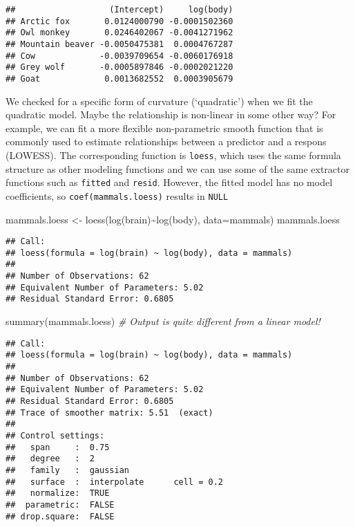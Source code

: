 \documentclass[
]{article}
\newenvironment{Shaded}{\begin{snugshade}}{\end{snugshade}}
\newcommand{\AttributeTok}[1]{\textcolor[rgb]{0.77,0.63,0.00}{#1}}
\newcommand{\CommentTok}[1]{\textcolor[rgb]{0.56,0.35,0.01}{\textit{#1}}}
\newcommand{\FunctionTok}[1]{\textcolor[rgb]{0.00,0.00,0.00}{#1}}
\newcommand{\NormalTok}[1]{#1}
\newcommand{\OtherTok}[1]{\textcolor[rgb]{0.56,0.35,0.01}{#1}}
\newcommand{\SpecialCharTok}[1]{\textcolor[rgb]{0.00,0.00,0.00}{#1}}
\begin{document}
\begin{verbatim}
##                   (Intercept)     log(body)
## Arctic fox       0.0124000790 -0.0001502360
## Owl monkey       0.0246402067 -0.0041271962
## Mountain beaver -0.0050475381  0.0004767287
## Cow             -0.0039709654 -0.0060176918
## Grey wolf       -0.0005897846 -0.0002021220
## Goat             0.0013682552  0.0003905679
\end{verbatim}

We checked for a specific form of curvature (`quadratic') when we fit
the quadratic model. Maybe the relationship is non-linear in some other
way? For example, we can fit a more flexible non-parametric smooth
function that is commonly used to estimate relationships between a
predictor and a respons (LOWESS). The corresponding function is
\texttt{loess}, which uses the same formula structure as other modeling
functions and we can use some of the same extractor functions such as
\texttt{fitted} and \texttt{resid}. However, the fitted model has no
model coefficients, so \texttt{coef(mammals.loess)} results in
\texttt{NULL}

\begin{Shaded}
\begin{Highlighting}[]
\NormalTok{mammals.loess }\OtherTok{\textless{}{-}} \FunctionTok{loess}\NormalTok{(}\FunctionTok{log}\NormalTok{(brain)}\SpecialCharTok{\textasciitilde{}}\FunctionTok{log}\NormalTok{(body), }\AttributeTok{data=}\NormalTok{mammals)}
\NormalTok{mammals.loess}
\end{Highlighting}
\end{Shaded}

\begin{verbatim}
## Call:
## loess(formula = log(brain) ~ log(body), data = mammals)
## 
## Number of Observations: 62 
## Equivalent Number of Parameters: 5.02 
## Residual Standard Error: 0.6805
\end{verbatim}

\begin{Shaded}
\begin{Highlighting}[]
\FunctionTok{summary}\NormalTok{(mammals.loess)  }\CommentTok{\# Output is quite different from a linear model!}
\end{Highlighting}
\end{Shaded}

\begin{verbatim}
## Call:
## loess(formula = log(brain) ~ log(body), data = mammals)
## 
## Number of Observations: 62 
## Equivalent Number of Parameters: 5.02 
## Residual Standard Error: 0.6805 
## Trace of smoother matrix: 5.51  (exact)
## 
## Control settings:
##   span     :  0.75 
##   degree   :  2 
##   family   :  gaussian
##   surface  :  interpolate      cell = 0.2
##   normalize:  TRUE
##  parametric:  FALSE
## drop.square:  FALSE
\end{verbatim}
\end{document}
